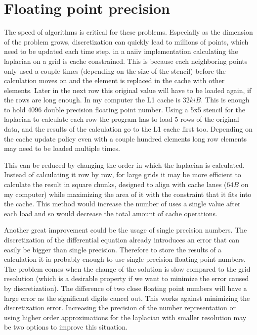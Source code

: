 \documentclass[pdftex,12pt,a4paper]{article}
\begin{document}
	\section{Floating point precision}
		The speed of algorithms is critical for these problems. Especially as the dimension of the problem grows, discretization can quickly lead to millions of points, which need to be updated each time step. in a naiiv implementation calculating the laplacian on a grid is cache constrained. This is because each neighboring points only used a couple times (depending on the size of the stencil) before the calculation moves on and the element is replaced in the cache with other elements. Later in the next row this original value will have to be loaded again, if the rows are long enough. In my computer the L1 cache is $32kiB$. This is enough to hold $4096$ double precision floating point number. Using a 5x5 stencil for the laplacian to calculate each row the program has to load 5 rows of the original data, and the results of the calculation go to the L1 cache first too. Depending on the cache update policy even with a couple hundred elements long row elements may need to be loaded multiple times.
		
		This can be reduced by changing the order in which the laplacian is calculated. Instead of calculating it row by row, for large grids it may be more efficient to calculate the result in square chunks, designed to align with cache lanes ($64B$ on my computer) while maximizing the area of it with the constraint that it fits into the cache. This method would increase the number of uses a single value after each load and so would decrease the total amount of cache operations.
		
		Another great improvement could be the usage of single precision numbers. The discretization of the differential equation already introduces an error that can easily be bigger than single precision. Therefore to store the results of a calculation it ia probably enough to use single precision floating point numbers. The problem comes when the change of the solution is slow compared to the grid resolution (which is a desirable property if we want to minimize the error caused by discretization). The difference of two close floating point numbers will have a large error as the significant digits cancel out. This works against minimizing the discretization error. Increasing the precision of the number representation or using higher order approximations for the laplacian with smaller resolution may be two options to improve this situation.
\end{document}
